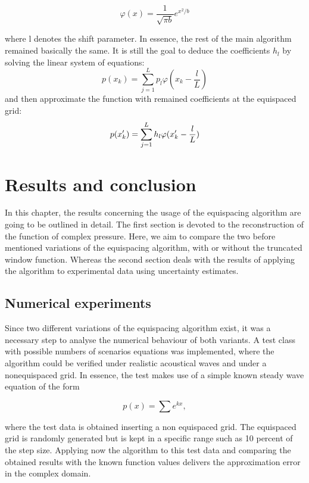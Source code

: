 \documentclass[11pt]{report} %
\begin{document}
\begin{equation}
\varphi(x)= \frac{1}{\sqrt{\pi b}}  e^{x^2/b}
\end{equation}

where l denotes the shift parameter.
In essence, the rest of the main algorithm remained basically the same.
It is still the goal to deduce the coefficients $h_{l}$ by solving the linear system of equations: 
\begin{equation}
p(x_{k})=\sum\limits_{j=1}^L p_{l}\varphi(x_{k}-\frac{l}{L})
\end{equation}
and then approximate the function with remained coefficients at the equispaced grid: 
\begin{equation}
p(x'_{k})= \sum\limits_{j=1}^L h_{l}\varphi(x'_{k}-\frac{l}{L}) \notag
\end{equation}


\chapter{Results and conclusion}
In this chapter, the results concerning the usage of the equispacing algorithm are going to be outlined in detail. 
The first section is devoted to the reconstruction of the function of complex pressure.
Here, we aim to compare the two before mentioned variations of the equispacing algorithm, with or without the truncated window function. 
Whereas the second section deals with the results of applying the algorithm to experimental data using uncertainty estimates. 
 
\section{Numerical experiments}
Since two different variations of the equispacing algorithm exist, it was a necessary step to analyse the numerical behaviour of both variants.
A test class with possible numbers of scenarios equations was implemented, where the  
algorithm could be verified under realistic acoustical waves and under a nonequispaced grid.
In essence, the test makes use of a simple known steady wave equation of the form

\begin{equation}
p(x)= \sum e^{kx},
\end{equation}

where the test data is obtained inserting a non equispaced grid. 
The equispaced grid is randomly generated but is kept in a specific range such as 10 percent of the step size. 
Applying now the algorithm to this test data and comparing the obtained results with the known function values delivers the approximation error in the complex domain.
\end{document}
